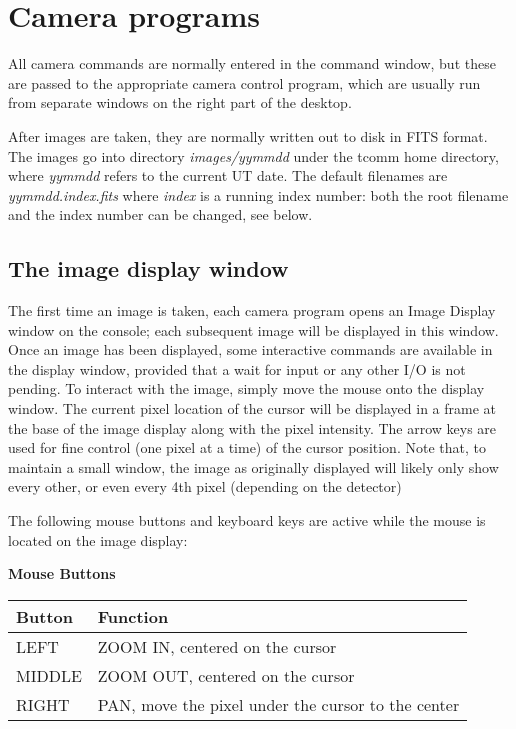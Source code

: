\documentclass[10pt]{report}
\begin{document}
\section{Camera programs}

All camera commands are normally entered in the command window, but these
are passed to the appropriate camera control program, which are usually
run from separate windows on the right part of the desktop.

After images are taken, they are normally written out to disk in FITS
format. The images go into directory \textit{images/yymmdd} under the
tcomm home directory, where \textit{yymmdd} refers to the current UT
date. The default filenames are \textit{yymmdd.index.fits} where \textit{index}
is a running index number: both the root filename and the index number
can be changed, see below.

\subsection{The image display window}

The first time an image is taken, each camera program opens an Image Display
window on the console; each subsequent image will be displayed in this
window.  Once an image has been displayed, some interactive commands
are available in the display window,
provided that a wait for input or any other I/O is not pending.  To
interact with the image, simply move the mouse onto the display window.
The current pixel location of the cursor will be displayed in a frame at
the base of the image display along with the pixel intensity.  The arrow
keys are used for fine control (one pixel at a time) of the cursor
position. Note that, to maintain a small window, the image as originally
displayed will likely only show every other, or even every 4th pixel 
(depending on the detector)

The following mouse buttons and keyboard keys are active while the mouse
is located on the image display:

\begin{center}
{\bf Mouse Buttons}\\
\begin{tabular}{ll}
\hline
Button & Function\\
\hline
LEFT  &ZOOM IN, centered on the cursor\\
MIDDLE&ZOOM OUT, centered on the cursor\\
RIGHT &PAN, move the pixel under the cursor to the center\\
\hline
\end{tabular}
\end{center}
\end{document}
